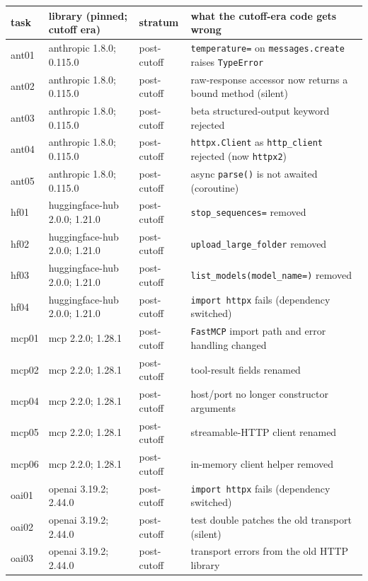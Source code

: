 \documentclass[11pt]{article}
\newcommand{\code}[1]{\texttt{#1}}
\begin{document}
\begin{table}[t]
\centering
\footnotesize
\begin{tabular}{lll>{\raggedright\arraybackslash}p{6.0cm}}
\toprule
task & library (pinned; cutoff era) & stratum & what the cutoff-era code gets wrong \\
\midrule
ant01 & anthropic 1.8.0; 0.115.0 & post-cutoff & \code{temperature=} on \code{messages.create} raises \code{TypeError} \\
ant02 & anthropic 1.8.0; 0.115.0 & post-cutoff & raw-response accessor now returns a bound method (silent) \\
ant03 & anthropic 1.8.0; 0.115.0 & post-cutoff & beta structured-output keyword rejected \\
ant04 & anthropic 1.8.0; 0.115.0 & post-cutoff & \code{httpx.Client} as \code{http\_client} rejected (now \code{httpx2}) \\
ant05 & anthropic 1.8.0; 0.115.0 & post-cutoff & async \code{parse()} is not awaited (coroutine) \\
hf01 & huggingface-hub 2.0.0; 1.21.0 & post-cutoff & \code{stop\_sequences=} removed \\
hf02 & huggingface-hub 2.0.0; 1.21.0 & post-cutoff & \code{upload\_large\_folder} removed \\
hf03 & huggingface-hub 2.0.0; 1.21.0 & post-cutoff & \code{list\_models(model\_name=)} removed \\
hf04 & huggingface-hub 2.0.0; 1.21.0 & post-cutoff & \code{import httpx} fails (dependency switched) \\
mcp01 & mcp 2.2.0; 1.28.1 & post-cutoff & \code{FastMCP} import path and error handling changed \\
mcp02 & mcp 2.2.0; 1.28.1 & post-cutoff & tool-result fields renamed \\
mcp04 & mcp 2.2.0; 1.28.1 & post-cutoff & host/port no longer constructor arguments \\
mcp05 & mcp 2.2.0; 1.28.1 & post-cutoff & streamable-HTTP client renamed \\
mcp06 & mcp 2.2.0; 1.28.1 & post-cutoff & in-memory client helper removed \\
oai01 & openai 3.19.2; 2.44.0 & post-cutoff & \code{import httpx} fails (dependency switched) \\
oai02 & openai 3.19.2; 2.44.0 & post-cutoff & test double patches the old transport (silent) \\
oai03 & openai 3.19.2; 2.44.0 & post-cutoff & transport errors from the old HTTP library \\

\end{tabular}
\end{table}
\end{document}
